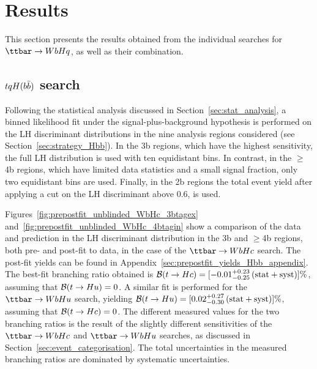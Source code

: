 \section{Results}
\label{sec:result}

This section presents the results obtained from the individual searches for $\Hq$, as well as their combination. 

\subsection{$tqH(b\bar{b})$ search}
\label{sec:results_Hbb}

Following the statistical analysis discussed in Section~\ref{sec:stat_analysis}, a binned likelihood fit under the signal-plus-background hypothesis 
is performed on the LH discriminant distributions in the nine analysis regions considered (see Section~\ref{sec:strategy_Hbb}).
In the 3b regions, which have the highest sensitivity, the full LH distribution is used with ten equidistant bins. In contrast, in the $\geq$4b regions,
which have limited data statistics and a small signal fraction, only two equidistant bins are used. Finally, in the 2b regions the total event yield
after applying a cut on the LH discriminant above 0.6, is used. 

Figures~\ref{fig:prepostfit_unblinded_WbHc_3btagex} and~\ref{fig:prepostfit_unblinded_WbHc_4btagin} show a comparison 
of the data and prediction in the LH discriminant distribution in the 3b and $\geq$4b regions, both pre- and 
post-fit to data, in the case of the $\Hc$ search.  The post-fit yields can be found in Appendix~\ref{sec:prepostfit_yields_Hbb_appendix}.
The best-fit branching ratio obtained is $\mathcal{B}(t\to Hc)=[-0.01^{+0.23}_{-0.25}\,(\mathrm{stat+syst})]\%$,
assuming that $\mathcal{B}(t\to Hu)=0$. 
A similar fit is performed for the $\Hu$ search, yielding $\mathcal{B}(t\to Hu)=[0.02^{+0.27}_{-0.30}\,(\mathrm{stat+syst})]\%$,
assuming that $\mathcal{B}(t\to Hc)=0$.  The different measured values for the two branching ratios is the result of the slightly different sensitivities
of the $\Hc$ and $\Hu$ searches, as discussed in Section~\ref{sec:event_categorisation}.
The total uncertainties in the measured branching ratios are dominated by systematic uncertainties.

